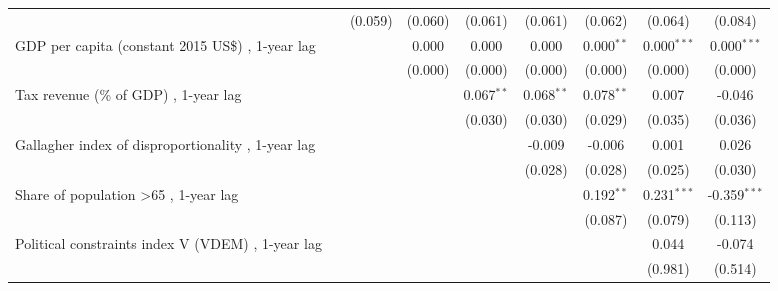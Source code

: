\begin{table}[htbp]
\begin{tabular}{lcccccccc}
                                                                              &              & (0.059)       & (0.060)       & (0.061)        & (0.061)        & (0.062)        & (0.064)        & (0.084)\\   
      GDP per capita (constant 2015 US\$) , 1-year lag                        &              &               & 0.000         & 0.000          & 0.000          & 0.000$^{**}$   & 0.000$^{***}$  & 0.000$^{***}$\\   
                                                                              &              &               & (0.000)       & (0.000)        & (0.000)        & (0.000)        & (0.000)        & (0.000)\\   
      Tax revenue (\% of GDP) , 1-year lag                                    &              &               &               & 0.067$^{**}$   & 0.068$^{**}$   & 0.078$^{**}$   & 0.007          & -0.046\\   
                                                                              &              &               &               & (0.030)        & (0.030)        & (0.029)        & (0.035)        & (0.036)\\   
      Gallagher index of disproportionality , 1-year lag                      &              &               &               &                & -0.009         & -0.006         & 0.001          & 0.026\\   
                                                                              &              &               &               &                & (0.028)        & (0.028)        & (0.025)        & (0.030)\\   
      Share of population >65 , 1-year lag                                    &              &               &               &                &                & 0.192$^{**}$   & 0.231$^{***}$  & -0.359$^{***}$\\   
                                                                              &              &               &               &                &                & (0.087)        & (0.079)        & (0.113)\\   
      Political constraints index V (VDEM) , 1-year lag                       &              &               &               &                &                &                & 0.044          & -0.074\\   
                                                                              &              &               &               &                &                &                & (0.981)        & (0.514)\\   

\end{tabular}
\end{table}
